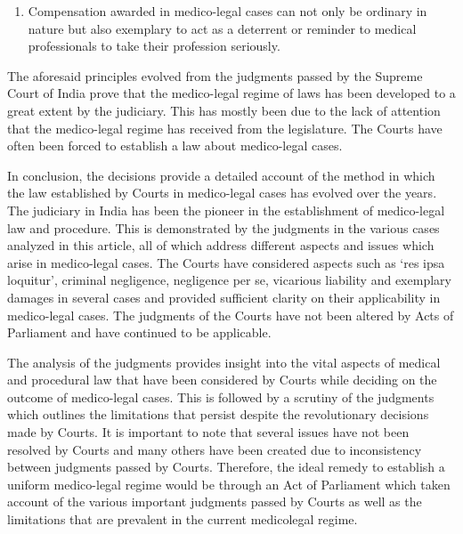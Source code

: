 \begin{multicols}{2}
\begin{enumerate}
\item Compensation awarded in medico-legal cases can not only be ordinary in nature but also
exemplary to act as a deterrent or reminder to medical professionals to take their profession
seriously.
\end{enumerate}

\vspace{-.2cm}

\noi
The aforesaid principles evolved from the judgments passed by the Supreme Court of India prove
that the medico-legal regime of laws has been developed to a great extent by the judiciary. This
has mostly been due to the lack of attention that the medico-legal regime has received from the
legislature. The Courts have often been forced to establish a law about medico-legal cases.


\noi
In conclusion, the decisions provide a detailed account of the method in which the law established
by Courts in medico-legal cases has evolved over the years. The judiciary in India has been the
pioneer in the establishment of medico-legal law and procedure. This is demonstrated by the judgments in the various cases analyzed in this article, all of which address different aspects and
issues which arise in medico-legal cases. The Courts have considered aspects such as ‘res ipsa
loquitur’, criminal negligence, negligence per se, vicarious liability and exemplary damages in
several cases and provided sufficient clarity on their applicability in medico-legal cases. The
judgments of the Courts have not been altered by Acts of Parliament and have continued to be
applicable.

\noi
The analysis of the judgments provides insight into the vital aspects of medical and procedural
law that have been considered by Courts while deciding on the outcome of medico-legal cases.
This is followed by a scrutiny of the judgments which outlines the limitations that persist despite
the revolutionary decisions made by Courts. It is important to note that several issues have not
been resolved by Courts and many others have been created due to inconsistency between
judgments passed by Courts. Therefore, the ideal remedy to establish a uniform medico-legal
regime would be through an Act of Parliament which taken account of the various important
judgments passed by Courts as well as the limitations that are prevalent in the current medicolegal regime.
\end{multicols}
